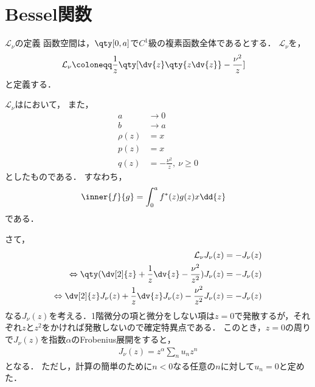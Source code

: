 \documentclass{report}
\begin{document}
    \section{Bessel関数}
      \begin{mydef}{$\mathcal{L}_{\nu}$の定義}{}
        函数空間は，$\qty[0, a]$で$C^1$級の複素函数全体であるとする．
        $\mathcal{L}_{\nu}$を，
        \begin{align}
          \mathcal{L}_{\nu} &\coloneqq \frac{1}{z}\qty[\dv{z}\qty{z\dv{z}} - \frac{\nu^2}{z}]
        \end{align}
        と定義する．
      \end{mydef}
      \begin{myrem}{}{}
        $\mathcal{L}_{\nu}$はにおいて，
        また，
        \begin{align}
          a &\to 0 \\ 
          b &\to a \\
          \rho(z) &= x \\ 
          p(z) &= x \\ 
          q(z) &= -\frac{\nu^2}{z},\ \nu \geq 0
        \end{align}
        としたものである．
        すなわち，
        \begin{align}
          \inner{f}{g} &= \int_{0}^{a}f^*(z)g(z)x\dd{z}
        \end{align}
        である．
      \end{myrem}
      さて，
      \begin{align}
        \mathcal{L}_{\nu}J_{\nu}(z) &= - J_{\nu}(z)  \\ 
        \Leftrightarrow \qty(\dv[2]{z} + \frac{1}{z}\dv{z} - \frac{\nu^2}{z^2})J_{\nu}(z) &= -J_{\nu}(z) \label{bessel-differential-eq-sub}\\ 
        \Leftrightarrow \dv[2]{z}J_{\nu}(z) + \frac{1}{z}\dv{z}J_{\nu}(z) - \frac{\nu^2}{z^2}J_{\nu}(z) &= -J_{\nu}(z) \label{bessel-differential-eq}
      \end{align}
      なる$J_{\nu}(z)$を考える．1階微分の項と微分をしない項は$z = 0$で発散するが，それぞれ$z$と$z^2$をかければ発散しないので確定特異点である．
      このとき，$z = 0$の周りで$J_{\nu}(z)$を指数$\alpha$のFrobenius展開をすると，
      \begin{align}
        J_{\nu}(z) = z^{\alpha}\sum_{n}u_nz^n\label{bessel-func-frobenius}
      \end{align}
      となる．
      ただし，計算の簡単のために$n < 0$なる任意の$n$に対して$u_n = 0$と定めた．
\end{document}
